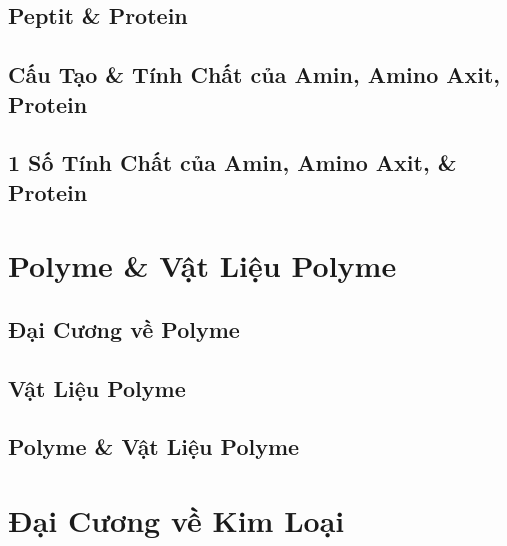 \documentclass{article}
\numberwithin{equation}{section}
\begin{document}

\subsection{Peptit \& Protein}


\subsection{Cấu Tạo \& Tính Chất của Amin, Amino Axit, Protein}


\subsection{1 Số Tính Chất của Amin, Amino Axit, \& Protein}


\section{Polyme \& Vật Liệu Polyme}

\subsection{Đại Cương về Polyme}


\subsection{Vật Liệu Polyme}


\subsection{Polyme \& Vật Liệu Polyme}


\section{Đại Cương về Kim Loại}
\end{document}
